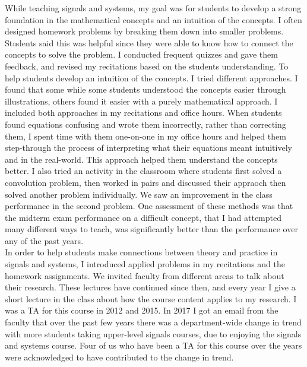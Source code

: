 \documentclass[10pt]{article}
\begin{document}
While teaching signals and systems, my goal was for students to develop a strong foundation in the mathematical concepts and an intuition of the concepts. 
I often designed homework problems by breaking them down into smaller problems. Students said this was helpful since they were able to know how to connect the concepts to solve the problem. %
I conducted frequent quizzes and gave them feedback, and revised my recitations based on the students understanding. %
To help students develop an intuition of the concepts. I tried different approaches. %
I found that some while some students understood the concepts easier through illustrations, others found it easier with a purely mathematical approach. I included both approaches in my recitations and office hours. 
When students found equations confusing and wrote them incorrectly, rather than correcting them, I spent time with them one-on-one in my office hours and helped them step-through the process of interpreting what their equations meant intuitively and in the real-world. This approach helped them understand the concepts better. 
I also tried an activity in the classroom where students first solved a convolution problem, then worked in pairs and discussed their appraoch then solved another problem individually. We saw an improvement in the class performance in the second problem. One assessment of these methods was that the midterm exam performance on a difficult concept, that I had attempted many different ways to teach, was significantly better than the performance over any of the past years. \\


In order to help students make connections between theory and practice in signals and systems,  
I introduced applied problems in my recitations and the homework assignments. We invited faculty from different areas to talk about their research. These lectures have continued since then, and every year I give a short lecture in the class about how the course content applies to my research.  I was a TA for this course in 2012 and 2015. In 2017 I got an email from the faculty that over the past few years there was a department-wide change in trend with more students taking upper-level signals courses, due to enjoying the signals and systems course. Four of us who have been a TA for this course over the years were acknowledged to have contributed to the change in trend. \\
\end{document}
